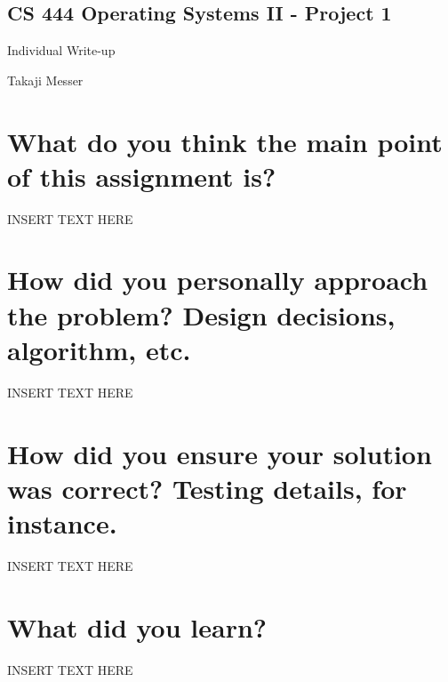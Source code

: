 \documentclass[letterpaper,10pt,titlepage,fleqn]{article}
\begin{document}
\pagestyle{empty}

\begin{center}
\section*{CS 444 Operating Systems II - Project 1}
Individual Write-up

Takaji Messer
\end{center}


\section*{What do you think the main point of this assignment is?}

INSERT TEXT HERE

\section*{How did you personally approach the problem? Design decisions, algorithm, etc.}

INSERT TEXT HERE

\section*{How did you ensure your solution was correct? Testing details, for instance.}

INSERT TEXT HERE

\section*{What did you learn?}

INSERT TEXT HERE
\end{document}

